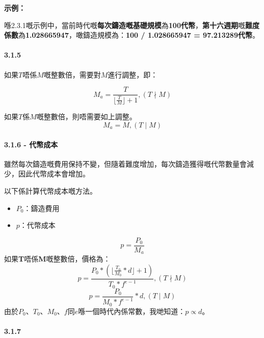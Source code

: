 \documentclass[
]{article}
\providecommand{\tightlist}{%
  \setlength{\itemsep}{0pt}\setlength{\parskip}{0pt}}
\begin{document}
\textbf{示例：}

喺2.3.1嘅示例中，當前時代嘅\textbf{每次鑄造嘅基礎規模}為\textbf{100代幣}，\textbf{第十六週期}嘅\textbf{難度係數}為\textbf{1.028665947}，噉鑄造規模為：\textbf{100
/ 1.028665947 = 97.213289代幣}。

\paragraph{3.1.5}\label{section}

如果\(T\)唔係\(M\)嘅整數倍，需要對\(M\)進行調整，即：

\begin{equation}
M_a = \frac{T}{\lfloor\frac{T}{M}\rfloor + 1}, (T \nmid M)
\end{equation}

如果\(T\)係\(M\)嘅整數倍，則唔需要如上調整。 \begin{equation}
M_a = M, (T \mid M)
\end{equation}

\paragraph{3.1.6 - 代幣成本}\label{ux4ee3ux5e63ux6210ux672c}

雖然每次鑄造嘅費用保持不變，但隨着難度增加，每次鑄造獲得嘅代幣數量會減少，因此代幣成本會增加。

以下係計算代幣成本嘅方法。

\begin{itemize}
\tightlist
\item
  \(P_0\)：鑄造費用
\item
  \(p\)：代幣成本
\end{itemize}

\begin{equation}
p = \frac{P_0}{M_a}
\end{equation} 如果\textbf{T}唔係\textbf{M}嘅整數倍，價格為：
\begin{equation}
p = \frac{P_0*(\lfloor\frac{T_0}{M_0}*d\rfloor + 1)}{T_0*f^{e-1}}, (T \nmid M)
\end{equation} \begin{equation}
p = \frac{P_0}{M_0*f^{e-1}}*d, (T \mid M)
\end{equation}
由於\(P_0\)、\(T_0\)、\(M_0\)、\(f\)同\(e\)喺一個時代內係常數，我哋知道：\(p \propto d\)。

\paragraph{3.1.7}\label{section-1}
\end{document}
